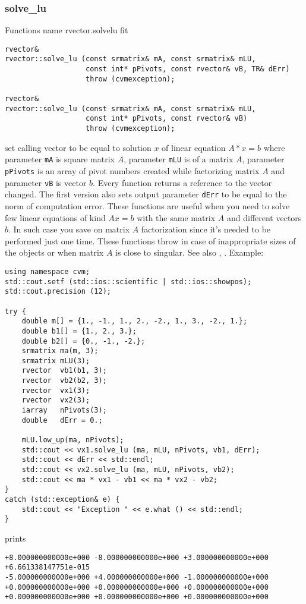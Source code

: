 \subsubsection{solve\_lu}
Functions%
\pdfdest name {rvector.solvelu} fit
\begin{verbatim}
rvector& 
rvector::solve_lu (const srmatrix& mA, const srmatrix& mLU, 
                   const int* pPivots, const rvector& vB, TR& dErr)
                   throw (cvmexception);

rvector&
rvector::solve_lu (const srmatrix& mA, const srmatrix& mLU, 
                   const int* pPivots, const rvector& vB)
                   throw (cvmexception);
\end{verbatim}
set calling vector to be equal to solution $x$ of linear equation
$A*x=b$ where parameter \verb"mA" is  square matrix $A$,
parameter \verb"mLU" is 
of a matrix $A$, parameter \verb"pPivots" is an array of pivot numbers
created while factorizing  matrix $A$
and parameter \verb"vB" is  vector $b$.
Every function returns a reference to the vector changed.
The first version also sets output parameter \verb"dErr" to be equal
to the norm of computation error.
These functions are useful when you need to solve few linear equations
of kind $Ax=b$ with the same matrix $A$ and different vectors $b$.
In such case you save on matrix $A$ factorization since it's needed to be
performed just one time.
These functions throw 
in case of inappropriate sizes
of the objects or when  matrix $A$ is close to singular.
See also , .
Example:
\begin{Verbatim}
using namespace cvm;
std::cout.setf (std::ios::scientific | std::ios::showpos);
std::cout.precision (12);

try {
    double m[] = {1., -1., 1., 2., -2., 1., 3., -2., 1.};
    double b1[] = {1., 2., 3.};
    double b2[] = {0., -1., -2.};
    srmatrix ma(m, 3);
    srmatrix mLU(3);
    rvector  vb1(b1, 3);
    rvector  vb2(b2, 3);
    rvector  vx1(3);
    rvector  vx2(3);
    iarray   nPivots(3);
    double   dErr = 0.;

    mLU.low_up(ma, nPivots);
    std::cout << vx1.solve_lu (ma, mLU, nPivots, vb1, dErr);
    std::cout << dErr << std::endl;
    std::cout << vx2.solve_lu (ma, mLU, nPivots, vb2);
    std::cout << ma * vx1 - vb1 << ma * vx2 - vb2;
}
catch (std::exception& e) {
    std::cout << "Exception " << e.what () << std::endl;
}
\end{Verbatim}
prints
\begin{Verbatim}
+8.000000000000e+000 -8.000000000000e+000 +3.000000000000e+000
+6.661338147751e-015
-5.000000000000e+000 +4.000000000000e+000 -1.000000000000e+000
+0.000000000000e+000 +0.000000000000e+000 +0.000000000000e+000
+0.000000000000e+000 +0.000000000000e+000 +0.000000000000e+000
\end{Verbatim}
\newpage




